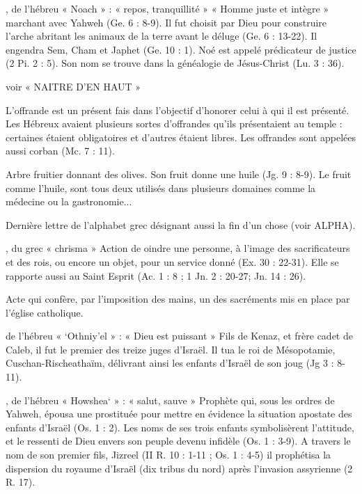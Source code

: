 \begin{multicols}{2}
, de l'hébreu « Noach » : « repos, tranquillité »
« Homme juste et intègre » marchant avec Yahweh (Ge. 6 : 8-9). Il fut choisit par Dieu pour construire l'arche abritant les animaux de la terre avant le déluge (Ge. 6 : 13-22). Il engendra Sem, Cham et Japhet (Ge. 10 : 1). Noé est appelé prédicateur de justice (2 Pi. 2 : 5). Son nom se trouve dans la généalogie de Jésus-Christ (Lu. 3 : 36).


voir « NAITRE D'EN HAUT »


L'offrande est un présent fais dans l'objectif d'honorer celui à qui il est présenté. Les Hébreux avaient plusieurs sortes d'offrandes qu'ils présentaient au temple : certaines étaient obligatoires et d'autres étaient libres. Les offrandes sont appelées aussi corban (Mc. 7 : 11).


Arbre fruitier donnant des olives. Son fruit donne une huile (Jg. 9 : 8-9). Le fruit comme l'huile, sont tous deux utilisés dans plusieurs domaines comme la médecine ou la gastronomie...


Dernière lettre de l'alphabet grec désignant aussi la fin d'un chose (voir ALPHA).


, du grec « chrisma »
Action de oindre une personne, à l'image des sacrificateurs et des rois, ou encore un objet, pour un service donné (Ex. 30 : 22-31). Elle se rapporte aussi au Saint Esprit (Ac. 1 : 8 ; 1 Jn. 2 : 20-27; Jn. 14 : 26).


Acte qui confère, par l'imposition des mains, un des sacréments mis en place par l'église catholique.


de l'hébreu « `Othniy'el » : « Dieu est puissant »
Fils de Kenaz, et frère cadet de Caleb, il fut le premier des treize juges d'Israël.
Il tua le roi de Mésopotamie, Cuschan-Rischeathaïm, délivrant ainsi les enfants d'Israël de son joug (Jg 3 : 8-11).


, de l'hébreu « Howshea` » : « salut, sauve »
Prophète qui, sous les ordres de Yahweh, épousa une prostituée pour mettre en évidence la situation apostate des enfants d'Israël (Os. 1 : 2). Les noms de ses trois enfants symbolisèrent l'attitude, et le ressenti de Dieu envers son peuple devenu infidèle (Os. 1 : 3-9). A travers le nom de son premier fils, Jizreel (II R. 10 : 1-11 ; Os. 1 : 4-5) il prophétisa la dispersion du royaume d'Israël (dix tribus du nord) après l'invasion assyrienne (2 R. 17).



\end{multicols}
